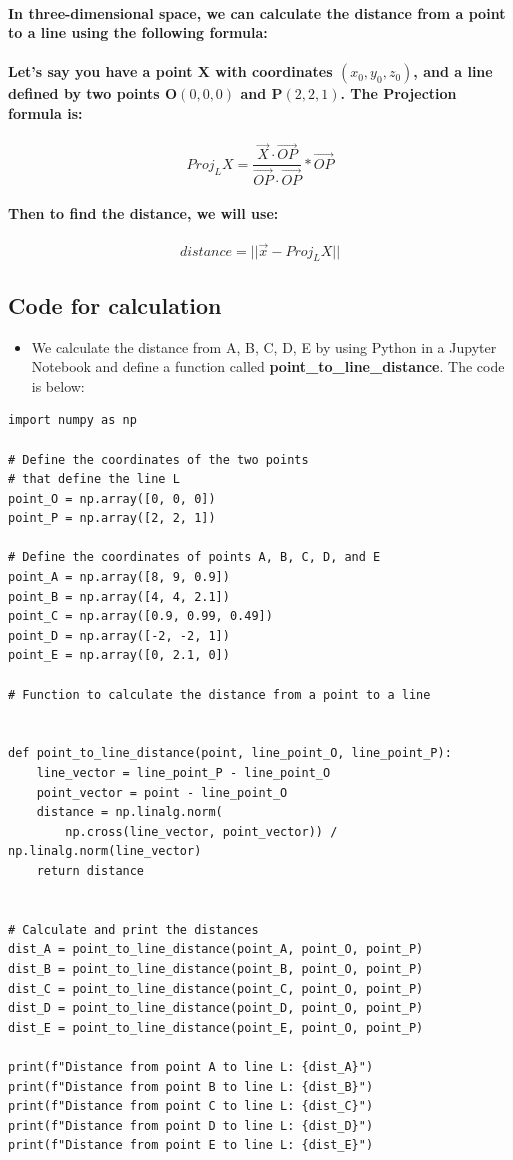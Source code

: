 \documentclass[11pt]{article} %
\begin{document}
\paragraph{In three-dimensional space, we can calculate the distance from a point to a line using the following formula:}
\paragraph{Let's say you have a point X with coordinates $(x_0, y_0, z_0)$, and a line defined by two points O$(0,0,0)$ and P$(2,2,1)$. The Projection formula is:}
% 
$$ Proj_{L}X = \frac{\vec{X} \cdot \vec{OP}}{\vec{OP} \cdot \vec{OP}} * \vec{OP} $$
% 
\paragraph{Then to find the distance, we will use:}

$$
    distance = ||\vec{x} - Proj_{L}X||
$$
% 

% 
% 
\subsection{Code for calculation}
\begin{itemize}
    \item We calculate the distance from A, B, C, D, E by using Python in a Jupyter Notebook and define a function called \textbf{point\_to\_line\_distance}. The code is below:
\end{itemize}
% 
% 
% 
\begin{lstlisting}[style=pystyle]
import numpy as np

# Define the coordinates of the two points 
# that define the line L
point_O = np.array([0, 0, 0])
point_P = np.array([2, 2, 1])

# Define the coordinates of points A, B, C, D, and E
point_A = np.array([8, 9, 0.9])
point_B = np.array([4, 4, 2.1])
point_C = np.array([0.9, 0.99, 0.49])
point_D = np.array([-2, -2, 1])
point_E = np.array([0, 2.1, 0])

# Function to calculate the distance from a point to a line


def point_to_line_distance(point, line_point_O, line_point_P):
    line_vector = line_point_P - line_point_O
    point_vector = point - line_point_O
    distance = np.linalg.norm(
        np.cross(line_vector, point_vector)) / np.linalg.norm(line_vector)
    return distance


# Calculate and print the distances
dist_A = point_to_line_distance(point_A, point_O, point_P)
dist_B = point_to_line_distance(point_B, point_O, point_P)
dist_C = point_to_line_distance(point_C, point_O, point_P)
dist_D = point_to_line_distance(point_D, point_O, point_P)
dist_E = point_to_line_distance(point_E, point_O, point_P)

print(f"Distance from point A to line L: {dist_A}")
print(f"Distance from point B to line L: {dist_B}")
print(f"Distance from point C to line L: {dist_C}")
print(f"Distance from point D to line L: {dist_D}")
print(f"Distance from point E to line L: {dist_E}")
\end{lstlisting}
\end{document}
